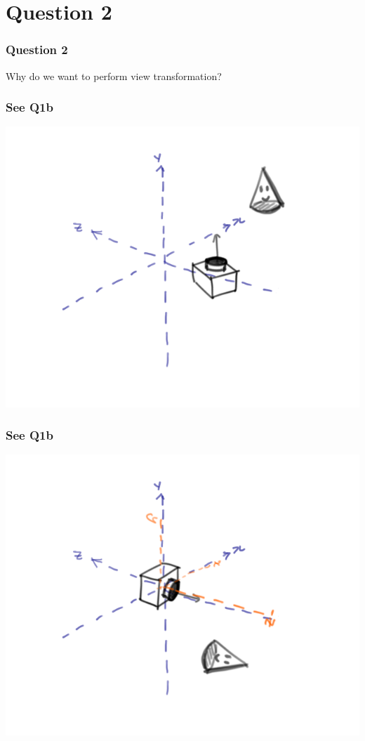 \documentclass{beamer}
\begin{document}
\section{Question 2}

\begin{frame}
    \frametitle{Question 2}

    Why do we want to perform view transformation?
\end{frame}

\begin{frame}
    \frametitle{See Q1b}

    \begin{center}
        \includegraphics[scale=1.3]{q1b-orig.png}
    \end{center}

\end{frame}

\begin{frame}
    \frametitle{See Q1b}

    \begin{center}
        \includegraphics[scale=1.3]{q1b-align.png}
    \end{center}

\end{frame}
\end{document}
